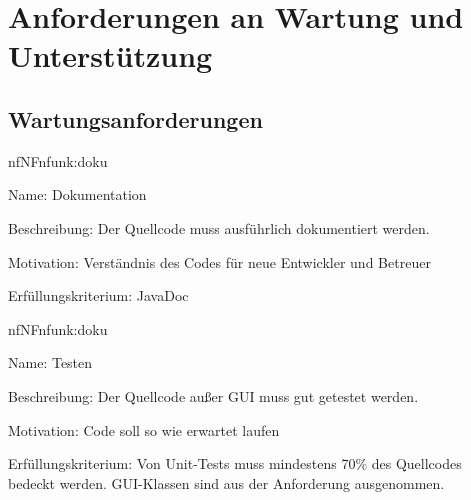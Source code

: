 \section{Anforderungen an Wartung und Unterstützung}

\subsection{Wartungsanforderungen}


\begin{description}[leftmargin=5em, style=sameline]	
	\begin{lhp}{nf}{NF}{nfunk:doku}
		\item [Name:] Dokumentation
		\item [Beschreibung:] Der Quellcode muss ausführlich dokumentiert werden.
		\item [Motivation:] Verständnis des Codes für neue Entwickler und Betreuer %
		\item [Erfüllungskriterium:] JavaDoc 
	\end{lhp}
\end{description}

\begin{description}[leftmargin=5em, style=sameline]	
	\begin{lhp}{nf}{NF}{nfunk:doku}
		\item [Name:] Testen
		\item [Beschreibung:] Der Quellcode außer GUI muss gut getestet werden.
		\item [Motivation:] Code soll so wie erwartet laufen %
		\item [Erfüllungskriterium:] Von Unit-Tests muss mindestens 70\% des Quellcodes bedeckt werden. GUI-Klassen sind aus der Anforderung ausgenommen.
	\end{lhp}
\end{description}

